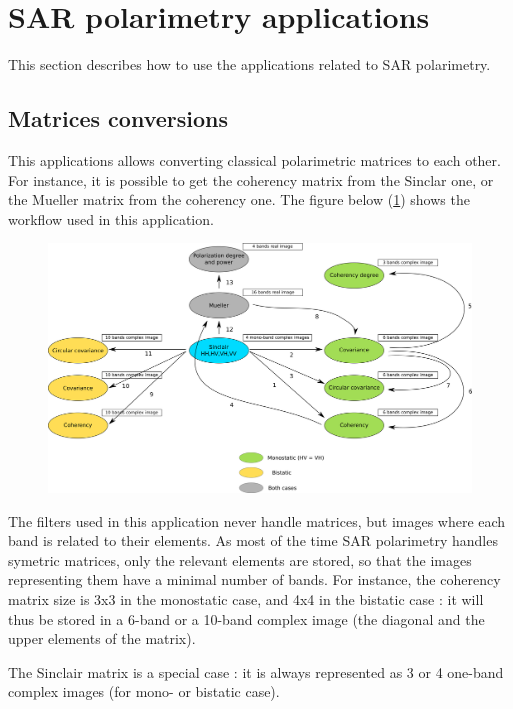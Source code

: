 \newpage
\section{SAR polarimetry applications}\label{sec:polarimetry}
This section describes how to use the applications related to SAR polarimetry.

\subsection{Matrices conversions}\label{ssec:polconv}

This applications allows converting classical polarimetric matrices to each other.
For instance, it is possible to get the coherency matrix from the Sinclar one, or the Mueller matrix from the coherency one.
The figure below (\ref{fig:polconv}) shows the workflow used in this application.

\begin{figure}[h]
  \centering
   \includegraphics[width=\textwidth]{../Art/sarpol_conversion_schema.png}
  \label{fig:polconv}
\end{figure}

The filters used in this application never handle matrices, but images where each band is related to their elements.
As most of the time SAR polarimetry handles symetric matrices, only the relevant elements are stored, so that the images representing them have a minimal number of bands.
For instance, the coherency matrix size is 3x3 in the monostatic case, and 4x4 in the bistatic case : it will thus be stored in a 6-band or a 10-band complex image (the diagonal and the upper elements of the matrix).

The Sinclair matrix is a special case : it is always represented as 3 or 4 one-band complex images (for mono- or bistatic case).

